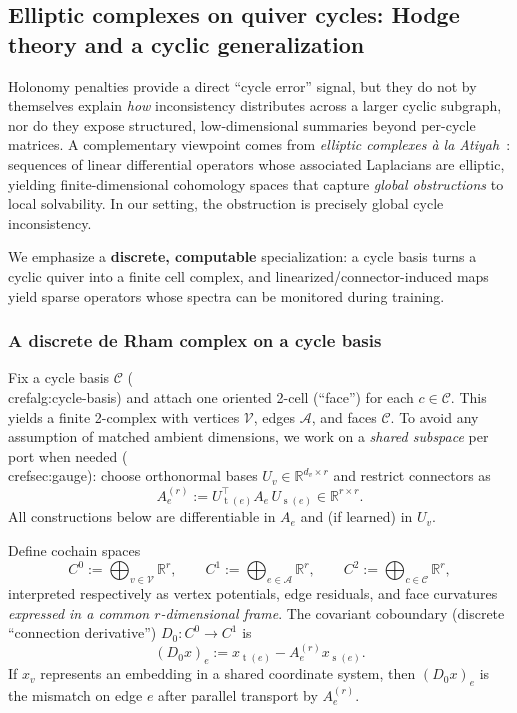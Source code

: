 \documentclass[11pt]{article}
\theoremstyle{definition}
\theoremstyle{plain}
\theoremstyle{remark}
\newcommand{\R}{\mathbb{R}}
\newcommand{\mc}[1]{\mathcal{#1}}
\newcommand{\Nodes}{\mc{V}}
\newcommand{\Edges}{\mc{A}}
\newcommand{\src}{\operatorname{s}}
\newcommand{\tgt}{\operatorname{t}}
\begin{document}
\subsection{Elliptic complexes on quiver cycles: Hodge theory and a cyclic generalization}
\label{sec:elliptic}

Holonomy penalties provide a direct ``cycle error'' signal, but they do not by themselves explain \emph{how} inconsistency distributes across a larger cyclic subgraph, nor do they expose structured, low-dimensional summaries beyond per-cycle matrices.
A complementary viewpoint comes from \emph{elliptic complexes \`a la Atiyah~\cite{AtiyahSingerIndex}}: sequences of linear differential operators whose associated Laplacians are elliptic, yielding finite-dimensional cohomology spaces that capture \emph{global obstructions} to local solvability.
In our setting, the obstruction is precisely global cycle inconsistency.

We emphasize a \textbf{discrete, computable} specialization: a cycle basis turns a cyclic quiver into a finite cell complex, and linearized/connector-induced maps yield sparse operators whose spectra can be monitored during training.

\subsubsection{A discrete de Rham complex on a cycle basis}
Fix a cycle basis $\mc{C}$ (\\cref{alg:cycle-basis}) and attach one oriented 2-cell (``face'') for each $c\in\mc{C}$.
This yields a finite 2-complex with vertices $\Nodes$, edges $\Edges$, and faces $\mc{C}$.
To avoid any assumption of matched ambient dimensions, we work on a \emph{shared subspace} per port when needed (\\cref{sec:gauge}): choose orthonormal bases $U_v\in\R^{d_v\times r}$ and restrict connectors as
\[
A_e^{(r)} := U_{\tgt(e)}^\top A_e\, U_{\src(e)}\in\R^{r\times r}.
\]
All constructions below are differentiable in $A_e$ and (if learned) in $U_v$.

Define cochain spaces
\[
C^0 := \bigoplus_{v\in\Nodes} \R^{r},
\qquad
C^1 := \bigoplus_{e\in\Edges} \R^{r},
\qquad
C^2 := \bigoplus_{c\in\mc{C}} \R^{r},
\]
interpreted respectively as vertex potentials, edge residuals, and face curvatures \emph{expressed in a common $r$-dimensional frame}.
The covariant coboundary (discrete ``connection derivative'') $D_0:C^0\to C^1$ is
\[
(D_0 x)_e := x_{\tgt(e)} - A_e^{(r)} x_{\src(e)}.
\]
If $x_v$ represents an embedding in a shared coordinate system, then $(D_0 x)_e$ is the mismatch on edge $e$ after parallel transport by $A_e^{(r)}$.
\end{document}
